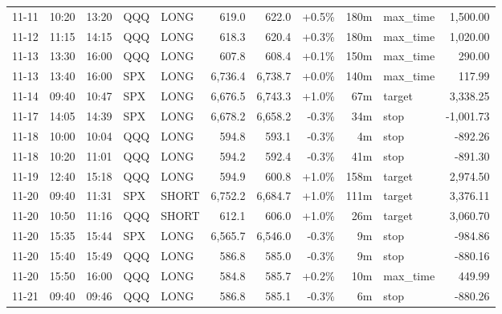 \documentclass[11pt,a4paper,twoside]{article}
\begin{document}
\begin{center}
\begin{longtable}{>{\color{txtmain}}l l l l l r r r r >{\color{txtmain}}l r}
11-11 & 10:20 & 13:20 & QQQ & LONG & 619.0 & 622.0 & \textcolor{wingreen}{+0.5\%} & 180m & max\_time & \textcolor{wingreen}{1,500.00} \\
11-12 & 11:15 & 14:15 & QQQ & LONG & 618.3 & 620.4 & \textcolor{wingreen}{+0.3\%} & 180m & max\_time & \textcolor{wingreen}{1,020.00} \\
11-13 & 13:30 & 16:00 & QQQ & LONG & 607.8 & 608.4 & \textcolor{wingreen}{+0.1\%} & 150m & max\_time & \textcolor{wingreen}{290.00} \\
11-13 & 13:40 & 16:00 & SPX & LONG & 6,736.4 & 6,738.7 & \textcolor{wingreen}{+0.0\%} & 140m & max\_time & \textcolor{wingreen}{117.99} \\
11-14 & 09:40 & 10:47 & SPX & LONG & 6,676.5 & 6,743.3 & \textcolor{wingreen}{+1.0\%} & 67m & target & \textcolor{wingreen}{3,338.25} \\
11-17 & 14:05 & 14:39 & SPX & LONG & 6,678.2 & 6,658.2 & \textcolor{lossred}{-0.3\%} & 34m & stop & \textcolor{lossred}{-1,001.73} \\
11-18 & 10:00 & 10:04 & QQQ & LONG & 594.8 & 593.1 & \textcolor{lossred}{-0.3\%} & 4m & stop & \textcolor{lossred}{-892.26} \\
11-18 & 10:20 & 11:01 & QQQ & LONG & 594.2 & 592.4 & \textcolor{lossred}{-0.3\%} & 41m & stop & \textcolor{lossred}{-891.30} \\
11-19 & 12:40 & 15:18 & QQQ & LONG & 594.9 & 600.8 & \textcolor{wingreen}{+1.0\%} & 158m & target & \textcolor{wingreen}{2,974.50} \\
11-20 & 09:40 & 11:31 & SPX & SHORT & 6,752.2 & 6,684.7 & \textcolor{wingreen}{+1.0\%} & 111m & target & \textcolor{wingreen}{3,376.11} \\
11-20 & 10:50 & 11:16 & QQQ & SHORT & 612.1 & 606.0 & \textcolor{wingreen}{+1.0\%} & 26m & target & \textcolor{wingreen}{3,060.70} \\
11-20 & 15:35 & 15:44 & SPX & LONG & 6,565.7 & 6,546.0 & \textcolor{lossred}{-0.3\%} & 9m & stop & \textcolor{lossred}{-984.86} \\
11-20 & 15:40 & 15:49 & QQQ & LONG & 586.8 & 585.0 & \textcolor{lossred}{-0.3\%} & 9m & stop & \textcolor{lossred}{-880.16} \\
11-20 & 15:50 & 16:00 & QQQ & LONG & 584.8 & 585.7 & \textcolor{wingreen}{+0.2\%} & 10m & max\_time & \textcolor{wingreen}{449.99} \\
11-21 & 09:40 & 09:46 & QQQ & LONG & 586.8 & 585.1 & \textcolor{lossred}{-0.3\%} & 6m & stop & \textcolor{lossred}{-880.26} \\

\end{longtable}
\end{center}
\end{document}
